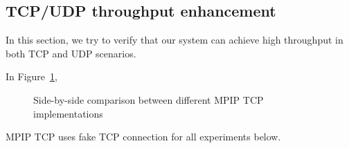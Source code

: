 
\subsection{TCP/UDP throughput enhancement}
\label{sec:tcp}

In this section, we try to verify that our system can achieve high throughput in both TCP and UDP scenarios. 

In Figure~\ref{fig.nonat},

\begin{figure}[htb]
\caption{Side-by-side comparison between different MPIP TCP implementations }
\label{fig.nonat}
\end{figure}


MPIP TCP uses fake TCP connection for all experiments below.

